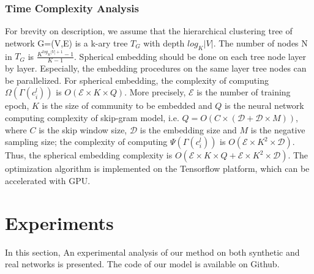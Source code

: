\documentclass{article}
\theoremstyle{definition}
\begin{document}
    \subsubsection{Time Complexity Analysis}
    For brevity on description, we assume that the hierarchical clustering tree of network G=(V,E) is a k-ary tree $T_G$ with depth $log_K|V|$. The number of nodes N in $T_G$ is $\frac{K^{log_K|V|+1} -1}{K-1}$. Spherical embedding should be done on each tree node layer by layer. Especially, the embedding procedures on the same layer tree nodes can be parallelized. For spherical embedding, the complexity of computing $\Omega(\Gamma(c_i^{l}))$ is $O(\mathcal{E} \times K \times Q)$. More precisely, $\mathcal{E}$ is the number of training epoch, $K$ is the size of community to be embedded and $Q$ is the neural network computing complexity of skip-gram model, i.e. $Q=O(C \times (\mathcal{D}+\mathcal{D} \times M))$, where $C$ is the skip window size, $\mathcal{D}$ is the embedding size and $M$ is the negative sampling size; the complexity of computing $\Psi(\Gamma(c_i^{l}))$ is $O(\mathcal{E} \times K^2 \times \mathcal{D})$. Thus, the spherical embedding complexity is $O(\mathcal{E} \times K \times Q + \mathcal{E} \times K^2 \times \mathcal{D})$. The optimization algorithm is implemented on the Tensorflow platform, which can be accelerated with GPU.

\section{Experiments}
	In this section, An experimental analysis of our method on both synthetic and real networks is presented. The code of our model is available on Github.
	
\end{document}
